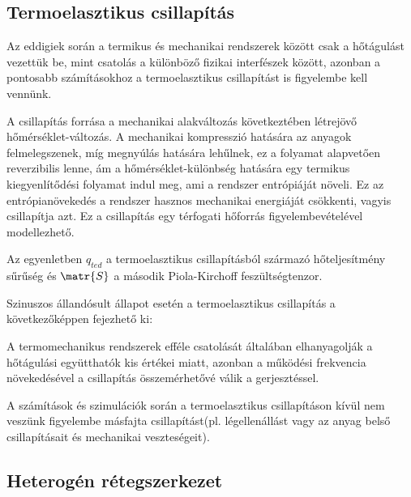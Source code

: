 
\subsection{Termoelasztikus csillapítás}

Az eddigiek során a termikus és mechanikai rendszerek között csak a hőtágulást vezettük be, mint csatolás a különböző fizikai interfészek között, azonban a pontosabb számításokhoz a termoelasztikus csillapítást is figyelembe kell vennünk.

A csillapítás forrása a mechanikai alakváltozás következtében létrejövő hőmérséklet-változás. A mechanikai kompresszió hatására az anyagok felmelegszenek, míg megnyúlás hatására lehűlnek, ez a folyamat alapvetően reverzibilis lenne, ám a hőmérséklet-különbség hatására egy termikus kiegyenlítődési folyamat indul meg, ami a rendszer entrópiáját növeli. Ez az entrópianövekedés a rendszer hasznos mechanikai energiáját csökkenti, vagyis csillapítja azt. Ez a csillapítás egy térfogati hőforrás figyelembevételével modellezhető\cite{thermoelastic_damping}.


Az egyenletben $q_{ted}$ a termoelasztikus csillapításból származó hőteljesítmény sűrűség és $\matr{S}$ a második Piola-Kirchoff feszültségtenzor\cite{thermoelastic_damping}.

Szinuszos állandósult állapot esetén a termoelasztikus csillapítás a következőképpen fejezhető ki:


A termomechanikus rendszerek efféle csatolását általában elhanyagolják a hőtágulási együtthatók kis értékei miatt, azonban a működési frekvencia növekedésével a csillapítás összemérhetővé válik a gerjesztéssel.

A számítások és szimulációk során a termoelasztikus csillapításon kívül nem veszünk figyelembe másfajta csillapítást(pl. légellenállást vagy az anyag belső csillapításait és mechanikai veszteségeit).

\subsection{Heterogén rétegszerkezet}

